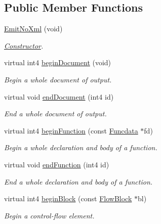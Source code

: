 \subsection*{Public Member Functions}
\begin{DoxyCompactItemize}
\item 
\mbox{\hyperlink{class_emit_no_xml_a0bc089362a21d7234adc86a101b392d6}{Emit\+No\+Xml}} (void)
\begin{DoxyCompactList}\small\item\em \mbox{\hyperlink{class_constructor}{Constructor}}. \end{DoxyCompactList}\item 
virtual int4 \mbox{\hyperlink{class_emit_no_xml_ac2cedec116ad98013fe4d7c00b230793}{begin\+Document}} (void)
\begin{DoxyCompactList}\small\item\em Begin a whole document of output. \end{DoxyCompactList}\item 
virtual void \mbox{\hyperlink{class_emit_no_xml_a453ae349735a6e890eb8ccf3bce4a965}{end\+Document}} (int4 id)
\begin{DoxyCompactList}\small\item\em End a whole document of output. \end{DoxyCompactList}\item 
virtual int4 \mbox{\hyperlink{class_emit_no_xml_ad06515c4f61b81ee45404871780e17a0}{begin\+Function}} (const \mbox{\hyperlink{class_funcdata}{Funcdata}} $\ast$fd)
\begin{DoxyCompactList}\small\item\em Begin a whole declaration and body of a function. \end{DoxyCompactList}\item 
virtual void \mbox{\hyperlink{class_emit_no_xml_a1d592e201a320b55d3924aa676d0b1b6}{end\+Function}} (int4 id)
\begin{DoxyCompactList}\small\item\em End a whole declaration and body of a function. \end{DoxyCompactList}\item 
virtual int4 \mbox{\hyperlink{class_emit_no_xml_ab2c5370c53fdbba7630f10249d933355}{begin\+Block}} (const \mbox{\hyperlink{class_flow_block}{Flow\+Block}} $\ast$bl)
\begin{DoxyCompactList}\small\item\em Begin a control-\/flow element. \end{DoxyCompactList}\item 

\end{DoxyCompactItemize}
